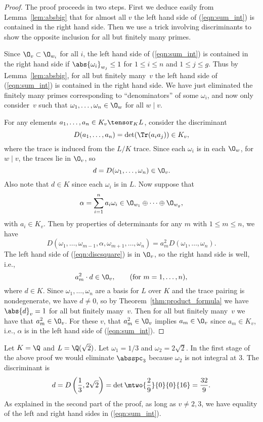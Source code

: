 \begin{proof}
  The proof proceeds in two steps.  First we deduce easily from
  Lemma~\ref{lem:absbig} that for almost all $v$ the left hand side 
of (\ref{eqn:sum_int}) is
  contained in the right hand side.  Then we use a trick involving
  discriminants to show the opposite inclusion for all but finitely
  many primes.
  
  Since $\O_v\subset \O_{w_i}$ for all $i$, the left hand side of
  (\ref{eqn:sum_int}) is contained in the right hand side if
  $\abs{\omega_i}_{w_j}\leq 1$ for $1\leq i\leq n$ and $1\leq j\leq
  g$.  Thus by Lemma~\ref{lem:absbig}, for all but finitely many~$v$
  the left hand side of (\ref{eqn:sum_int}) is contained in the right
  hand side.  We have just eliminated the finitely many primes
  corresponding to ``denominators'' of some $\omega_i$, and now only
  consider~$v$ such that $\omega_1,\ldots, \omega_n \in \O_{w}$ for
  all $w\mid v$.
  
  For any elements $a_1,\ldots, a_n \in K_v\tensor_K L$, consider the
  discriminant
  $$
  D(a_1,\ldots, a_n) = \det(\Tr(a_i a_j)) \in K_v,
  $$
  where the trace is induced from the $L/K$ trace.
  Since each $\omega_i$ is in each $\O_w$, for $w\mid v$, the
  traces lie in $\O_v$, so
  $$d = D(\omega_1,\ldots, \omega_n)\in \O_v.$$
  Also note that $d\in
  K$ since each $\omega_i$ is in $L$.  Now suppose that
  $$
  \alpha = \sum_{i=1}^n a_i \omega_i \in \O_{w_1} \oplus \cdots
  \oplus \O_{w_g},
  $$
  with $a_i \in K_v$.  Then by properties of determinants for any
  $m$ with $1\leq m\leq n$, we have
  \begin{equation}\label{eqn:discsquare} 
  D(\omega_1,\ldots, \omega_{m-1}, \alpha, \omega_{m+1}, \ldots, \omega_n)
    = a_m^2 D(\omega_1,\ldots, \omega_n).
  \end{equation}
  The left hand side of (\ref{eqn:discsquare}) is in $\O_v$, so the
  right hand side is well, i.e.,
  $$
  a_m^2 \cdot d \in \O_v, \qquad\text{(for }m=1,\ldots, n\text{)},
  $$
  where $d\in K$. Since $\omega_1,\ldots, \omega_n$ are a basis for
  $L$ over $K$ and the trace pairing is nondegenerate, we have $d\neq
  0$, so by Theorem~\ref{thm:product_formula} we have $\abs{d}_v=1$
  for all but finitely many~$v$.  Then for all but finitely many~$v$
  we have that $a_m^2\in \O_v$.  For these $v$, that $a_m^2\in\O_v$
  implies $a_m\in \O_v$ since $a_m\in K_v$, i.e., $\alpha$ is in the
  left hand side of (\ref{eqn:sum_int}).
\end{proof}
\begin{example}
Let $K=\Q$ and $L=\Q(\sqrt{2})$.  Let $\omega_1 = 1/3$ and $\omega_2 = 2\sqrt{2}$.  In the first stage of the above proof we would eliminate
$\absspc_3$ because $\omega_2$ is not integral at $3$.  The discriminant
is
$$
 d = D\left(\frac{1}{3}, 2\sqrt{2}\right)
   =\det \mtwo{\frac{2}{9}}{0}{0}{16} = \frac{32}{9}.
$$
As explained in the second part of the proof, as long as $v\neq 2, 3$,
we have equality of the left and right hand sides in (\ref{eqn:sum_int}).
\end{example}


